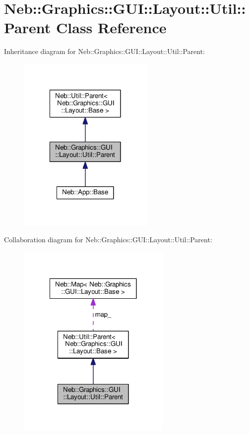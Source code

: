 \hypertarget{classNeb_1_1Graphics_1_1GUI_1_1Layout_1_1Util_1_1Parent}{\section{Neb\-:\-:Graphics\-:\-:G\-U\-I\-:\-:Layout\-:\-:Util\-:\-:Parent Class Reference}
\label{classNeb_1_1Graphics_1_1GUI_1_1Layout_1_1Util_1_1Parent}
}


Inheritance diagram for Neb\-:\-:Graphics\-:\-:G\-U\-I\-:\-:Layout\-:\-:Util\-:\-:Parent\-:
\nopagebreak
\begin{figure}[H]
\begin{center}
\leavevmode
\includegraphics[width=186pt]{classNeb_1_1Graphics_1_1GUI_1_1Layout_1_1Util_1_1Parent__inherit__graph}
\end{center}
\end{figure}


Collaboration diagram for Neb\-:\-:Graphics\-:\-:G\-U\-I\-:\-:Layout\-:\-:Util\-:\-:Parent\-:
\nopagebreak
\begin{figure}[H]
\begin{center}
\leavevmode
\includegraphics[width=210pt]{classNeb_1_1Graphics_1_1GUI_1_1Layout_1_1Util_1_1Parent__coll__graph}
\end{center}
\end{figure}
